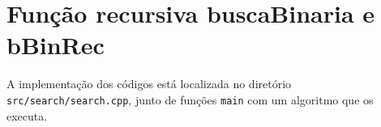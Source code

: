 \section{Função recursiva buscaBinaria e bBinRec}
A implementação dos códigos está localizada no diretório \texttt{src/search/search.cpp}, junto de funções \texttt{main} com um algoritmo que os executa.

